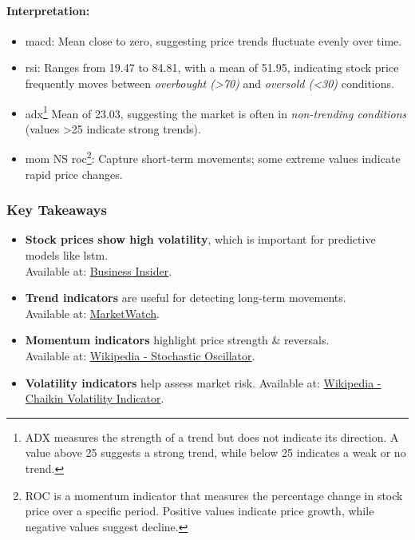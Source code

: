 \paragraph{Interpretation:}
\begin{itemize}
    \item \acrshort{macd}: Mean close to zero, suggesting price trends fluctuate evenly
    over time.
    \item \acrshort{rsi}: Ranges from 19.47 to 84.81, with a mean of 51.95, indicating 
    stock price frequently moves between \emph{overbought (>70)} and 
    \emph{oversold (<30)} conditions.
    \item \acrfull{adx}\footnote{ADX measures the strength of a trend but does not 
    indicate its direction. A value above 25 suggests a strong trend, while 
    below 25 indicates a weak or no trend.} Mean of 23.03, suggesting the market is often in
    \emph{non-trending conditions} (values >25 indicate strong trends).
    \item \acrshort{mom} NS \acrfull{roc}\footnote{ROC is a momentum indicator that measures the percentage change in stock price over a specific period. Positive values indicate price growth, while negative values suggest decline.}: Capture short-term movements; some 
    extreme values indicate rapid price changes.
\end{itemize}

\subsubsection{Key Takeaways}

\begin{itemize}
    \item \textbf{Stock prices show high volatility}, which is important for predictive
    models like \acrshort{lstm}. 
    \\Available at: \href{https://www.businessinsider.com/stock-market-outlook-danger-zone-sp500-200-day-moving-average-2025-3}{Business Insider}.
    \item \textbf{Trend indicators} are useful for detecting long-term movements. 
    \\Available at: \href{https://www.marketwatch.com/story/some-market-signals-arent-working-like-they-used-to-heres-the-one-to-watch-23a4e43a}{MarketWatch}.
    \item \textbf{Momentum indicators} highlight price strength \& reversals. 
    \\Available at: \href{https://en.wikipedia.org/wiki/Stochastic_oscillator}{Wikipedia - Stochastic Oscillator}.
    \item \textbf{Volatility indicators} help assess market risk. 
    Available at: \href{https://en.wikipedia.org/wiki/Chaikin_Analytics}{Wikipedia - Chaikin Volatility Indicator}.
\end{itemize}





